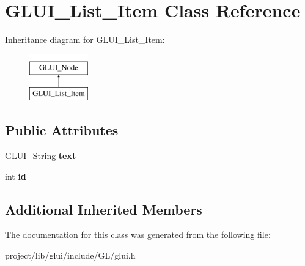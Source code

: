 \hypertarget{classGLUI__List__Item}{\section{G\-L\-U\-I\-\_\-\-List\-\_\-\-Item Class Reference}
\label{classGLUI__List__Item}
}
Inheritance diagram for G\-L\-U\-I\-\_\-\-List\-\_\-\-Item\-:\begin{figure}[H]
\begin{center}
\leavevmode
\includegraphics[height=2.000000cm]{classGLUI__List__Item}
\end{center}
\end{figure}
\subsection*{Public Attributes}
\begin{DoxyCompactItemize}
\item 
\hypertarget{classGLUI__List__Item_a8d7db7c4b7dd085352de5d1a6b849da2}{G\-L\-U\-I\-\_\-\-String {\bfseries text}}\label{classGLUI__List__Item_a8d7db7c4b7dd085352de5d1a6b849da2}

\item 
\hypertarget{classGLUI__List__Item_a329b7a460a0e449e4bb0bdc2e8ba519c}{int {\bfseries id}}\label{classGLUI__List__Item_a329b7a460a0e449e4bb0bdc2e8ba519c}

\end{DoxyCompactItemize}
\subsection*{Additional Inherited Members}


The documentation for this class was generated from the following file\-:\begin{DoxyCompactItemize}
\item 
project/lib/glui/include/\-G\-L/glui.\-h\end{DoxyCompactItemize}
